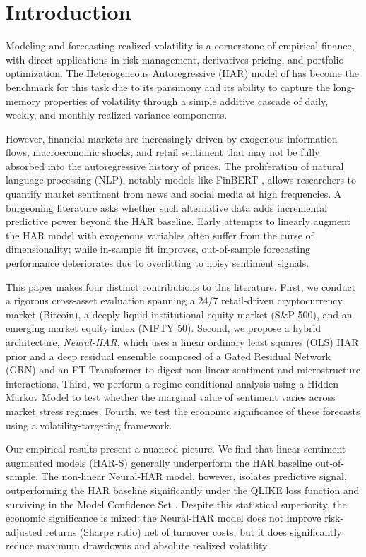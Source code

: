 \section{Introduction}
\label{sec:intro}
Modeling and forecasting realized volatility is a cornerstone of empirical finance, with direct applications in risk management, derivatives pricing, and portfolio optimization. The Heterogeneous Autoregressive (HAR) model of \cite{corsi2009simple} has become the benchmark for this task due to its parsimony and its ability to capture the long-memory properties of volatility through a simple additive cascade of daily, weekly, and monthly realized variance components.

However, financial markets are increasingly driven by exogenous information flows, macroeconomic shocks, and retail sentiment that may not be fully absorbed into the autoregressive history of prices. The proliferation of natural language processing (NLP), notably models like FinBERT \cite{araci2019finbert, yang2020finbert}, allows researchers to quantify market sentiment from news and social media at high frequencies. A burgeoning literature asks whether such alternative data adds incremental predictive power beyond the HAR baseline. Early attempts to linearly augment the HAR model with exogenous variables often suffer from the curse of dimensionality; while in-sample fit improves, out-of-sample forecasting performance deteriorates due to overfitting to noisy sentiment signals.

This paper makes four distinct contributions to this literature. First, we conduct a rigorous cross-asset evaluation spanning a 24/7 retail-driven cryptocurrency market (Bitcoin), a deeply liquid institutional equity market (S\&P 500), and an emerging market equity index (NIFTY 50). Second, we propose a hybrid architecture, \textit{Neural-HAR}, which uses a linear ordinary least squares (OLS) HAR prior and a deep residual ensemble composed of a Gated Residual Network (GRN) and an FT-Transformer \cite{gorishniy2021revisiting} to digest non-linear sentiment and microstructure interactions. Third, we perform a regime-conditional analysis using a Hidden Markov Model to test whether the marginal value of sentiment varies across market stress regimes. Fourth, we test the economic significance of these forecasts using a volatility-targeting framework.

Our empirical results present a nuanced picture. We find that linear sentiment-augmented models (HAR-S) generally underperform the HAR baseline out-of-sample. The non-linear Neural-HAR model, however, isolates predictive signal, outperforming the HAR baseline significantly under the QLIKE loss function and surviving in the Model Confidence Set \cite{hansen2011model}. Despite this statistical superiority, the economic significance is mixed: the Neural-HAR model does not improve risk-adjusted returns (Sharpe ratio) net of turnover costs, but it does significantly reduce maximum drawdowns and absolute realized volatility.
